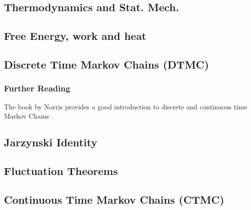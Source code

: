 \documentclass[Lectures.tex]{subfiles}
\begin{document}
\subsection{Thermodynamics and Stat. Mech.}

\subsection{Free Energy, work and heat}

\subsection{Discrete Time Markov Chains (DTMC)}


\subsubsection*{Further Reading}
The book by Norris provides a good introduction to discrete and continuous time Markov Chains .


\subsection{Jarzynski Identity}


\subsection{Fluctuation Theorems }


\subsection{Continuous Time Markov Chains (CTMC)}
\end{document}
